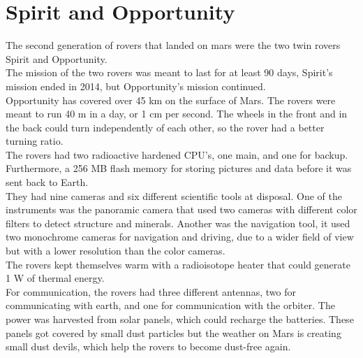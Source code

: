 \section{Spirit and Opportunity} \label{ch:existingSolutions_SpiritOpportunity} 
The second generation of rovers that landed on mars were the two twin rovers Spirit and Opportunity.\\
The mission of the two rovers was meant to last for at least 90 days, Spirit’s mission ended in 2014, but Opportunity's mission continued.\\ 
Opportunity has covered over 45 km on the surface of Mars. The rovers were meant to run 40 m in a day, or 1 cm per second. The wheels in the front and in the back could turn independently of each other, so the rover had a better turning ratio.\\
The rovers had two radioactive hardened CPU's, one main, and one for backup. Furthermore, a 256 MB flash memory for storing pictures and data before it was sent back to Earth\cite{spiritopportunity_overview}.\\
They had nine cameras and six different scientific tools at disposal. One of the instruments was the panoramic camera that used two cameras with different color filters to detect structure and minerals. Another was the navigation tool, it used two monochrome cameras for navigation and driving, due to a wider field of view but with a lower resolution than the color cameras.\\
The rovers kept themselves warm with a radioisotope heater that could generate 1 W of thermal energy.\\
For communication, the rovers had three different antennas, two for communicating with earth, and one for communication with the orbiter. The power was harvested from solar panels, which could recharge the batteries. These panels got covered by small dust particles but the weather on Mars is creating small dust devils, which help the rovers to become dust-free again\cite{Marsdust}.

